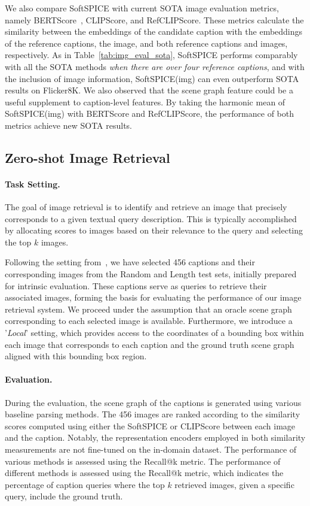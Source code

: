 We also compare SoftSPICE with current SOTA image evaluation metrics, namely BERTScore~\cite{zhang2019bertscore}, CLIPScore, and RefCLIPScore. These metrics calculate the similarity between the embeddings of the candidate caption with the embeddings of the reference captions, the image, and both reference captions and images, respectively. As in Table~\ref{tab:img_eval_sota}, SoftSPICE performs comparably with all the SOTA methods \textit{when there are over four reference captions}, and with the inclusion of image information, SoftSPICE(img) can even outperform SOTA results on Flicker8K. We also observed that the scene graph feature could be a useful supplement to caption-level features. By taking the harmonic mean of SoftSPICE(img) with BERTScore and RefCLIPScore, the performance of both metrics achieve new SOTA results.
\subsection{Zero-shot Image Retrieval}
\paragraph{Task Setting.} The goal of image retrieval is to identify and retrieve an image that precisely corresponds to a given textual query description. This is typically accomplished by allocating scores to images based on their relevance to the query and selecting the top $k$ images. 

Following the setting from~\citet{johnson2015image,wang2018scene}, we have selected 456 captions and their corresponding images from the Random and Length test sets, initially prepared for intrinsic evaluation. These captions serve as queries to retrieve their associated images, forming the basis for evaluating the performance of our image retrieval system. We proceed under the assumption that an oracle scene graph corresponding to each selected image is available. Furthermore, we introduce a '\textit{Local}' setting, which provides access to the coordinates of a bounding box within each image that corresponds to each caption and the ground truth scene graph aligned with this bounding box region. 

\paragraph{Evaluation.} During the evaluation, the scene graph of the captions is generated using various baseline parsing methods. The 456 images are ranked according to the similarity scores computed using either the SoftSPICE or CLIPScore between each image and the caption. Notably, the representation encoders employed in both similarity measurements are not fine-tuned on the in-domain dataset. The performance of various methods is assessed using the Recall@k metric. The performance of different methods is assessed using the Recall@k metric, which indicates the percentage of caption queries where the top $k$ retrieved images, given a specific query, include the ground truth.

